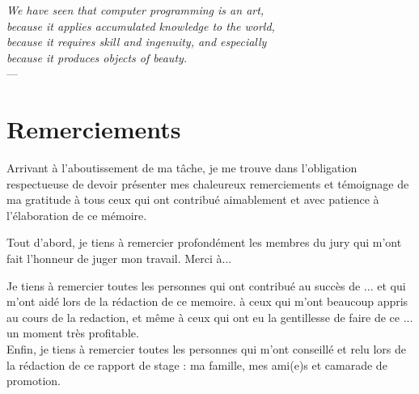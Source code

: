 

\begin{flushright}{\slshape    
We have seen that computer programming is an art, \\ 
because it applies accumulated knowledge to the world, \\ 
because it requires skill and ingenuity, and especially \\
because it produces objects of beauty.} \\ \medskip
---  \citep{knuth:1974}
\end{flushright}



\bigskip


\begingroup

\let\clearpage\relax
\let\cleardoublepage\relax
\let\cleardoublepage\relax
\chapter*{Remerciements}

Arrivant à l’aboutissement de ma tâche, je me trouve dans l’obligation respectueuse de devoir présenter mes chaleureux remerciements et témoignage de ma gratitude à tous ceux qui ont contribué aimablement et avec patience à l’élaboration de ce mémoire.

Tout d’abord, je tiens à remercier profondément les membres du jury qui m’ont fait l’honneur de juger mon travail. Merci à...

Je tiens à remercier toutes les personnes qui ont contribué au succès de ... et qui m'ont aidé lors de la rédaction de ce memoire. à ceux qui m’ont beaucoup appris au cours de la redaction, et même à ceux qui ont eu la gentillesse de faire de ce ... un moment très profitable.\\

Enfin, je tiens à remercier toutes les personnes qui m'ont conseillé et relu lors de la rédaction de ce rapport de stage : ma famille, mes ami(e)s et camarade de promotion.

\endgroup